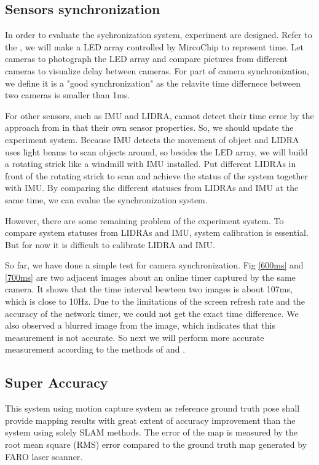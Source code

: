 \documentclass[conference]{IEEEtran}
\begin{document}
	\subsection{Sensors synchronization}
	In order to evaluate the sychronization system, experiment are designed. Refer to the \cite{Litos2006Synchronous}, we will make a LED array controlled by MircoChip to represent time. Let cameras to photograph the LED array and compare pictures from different cameras to visualize delay between cameras. For part of camera synchronization, we define it is a "good synchronization" as the relavite time differnece between two cameras is smaller than 1ms.
	\par
	For other sensors, such as IMU and LIDRA, cannot detect their time error by the approach from \cite{Litos2006Synchronous} in that their own sensor properties. So, we should update the experiment system. Because IMU detects the movement of object and LIDRA uses light beams to scan objects around, so besides the LED array, we will build a rotating strick like a windmill with IMU installed. Put different LIDRAs in front of the rotating strick to scan and achieve the  status of the system together with IMU. By comparing the different statuses from LIDRAs and IMU at the same time, we can evalue the synchronization system.
	\par
	However, there are some remaining problem of the experiment system. To compare system statuses from LIDRAs and IMU, system calibration is essential. But for now it is difficult to calibrate LIDRA and IMU.
	\par
	So far, we have done a simple test for camera synchronization. Fig \ref{600ms} and \ref{700ms} are two adjacent images about an online timer captured by the same camera. It shows that the time interval bewteen two images is about 107ms, which is close to 10Hz. Due to the limitations of the screen refresh rate and the accuracy of the network timer, we could not get the exact time difference. We also observed a blurred image from the image, which indicates that this measurement is not accurate. So next we will perform more accurate measurement according to the methods of \cite{Litos2006Synchronous} and \cite{8074435}.
	
	\subsection{Super Accuracy}
	This system using motion capture system as reference ground truth pose shall provide mapping results with great extent of accuracy improvement than the system using solely SLAM methods. The error of the map is measured by the root mean square (RMS) error compared to the ground truth map generated by FARO laser scanner.
	
\end{document}
